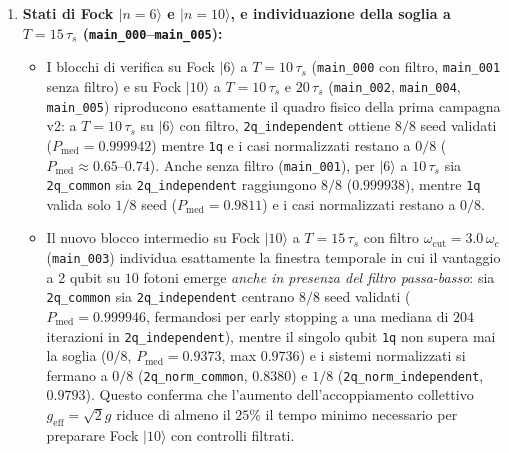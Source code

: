 \documentclass[11pt,a4paper]{article}
\begin{document}
\begin{enumerate}
    \item \textbf{Stati di Fock $|n=6\rangle$ e $|n=10\rangle$, e individuazione della soglia a $T = 15\,\tau_s$ (\texttt{main\_000}--\texttt{main\_005}):}
    \begin{itemize}
        \item I blocchi di verifica su Fock $|6\rangle$ a $T=10\,\tau_s$ (\texttt{main\_000} con filtro, \texttt{main\_001} senza filtro) e su Fock $|10\rangle$ a $T=10\,\tau_s$ e $20\,\tau_s$ (\texttt{main\_002}, \texttt{main\_004}, \texttt{main\_005}) riproducono esattamente il quadro fisico della prima campagna v2: a $T=10\,\tau_s$ su $|6\rangle$ con filtro, \texttt{2q\_independent} ottiene $8/8$ seed validati ($P_{\text{med}} = 0.999942$) mentre \texttt{1q} e i casi normalizzati restano a $0/8$ ($P_{\text{med}} \approx 0.65\text{--}0.74$). Anche senza filtro (\texttt{main\_001}), per $|6\rangle$ a $10\,\tau_s$ sia \texttt{2q\_common} sia \texttt{2q\_independent} raggiungono $8/8$ ($0.999938$), mentre \texttt{1q} valida solo $1/8$ seed ($P_{\text{med}} = 0.9811$) e i casi normalizzati restano a $0/8$.
        \item Il nuovo blocco intermedio su Fock $|10\rangle$ a $T = 15\,\tau_s$ con filtro $\omega_{\text{cut}} = 3.0\,\omega_c$ (\texttt{main\_003}) individua esattamente la finestra temporale in cui il vantaggio a 2 qubit su $10$ fotoni emerge \emph{anche in presenza del filtro passa-basso}: sia \texttt{2q\_common} sia \texttt{2q\_independent} centrano $8/8$ seed validati ($P_{\text{med}} = 0.999946$, fermandosi per early stopping a una mediana di $204$ iterazioni in \texttt{2q\_independent}), mentre il singolo qubit \texttt{1q} non supera mai la soglia ($0/8$, $P_{\text{med}} = 0.9373$, max $0.9736$) e i sistemi normalizzati si fermano a $0/8$ (\texttt{2q\_norm\_common}, $0.8380$) e $1/8$ (\texttt{2q\_norm\_independent}, $0.9793$). Questo conferma che l'aumento dell'accoppiamento collettivo $g_{\text{eff}} = \sqrt{2}g$ riduce di almeno il $25\%$ il tempo minimo necessario per preparare Fock $|10\rangle$ con controlli filtrati.
    \end{itemize}


\end{enumerate}
\end{document}
